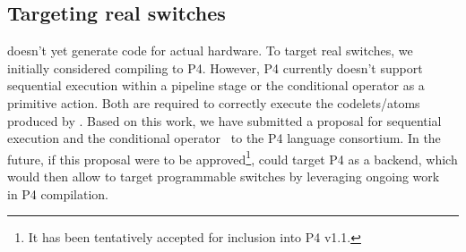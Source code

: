 \subsection{Targeting real switches}
\label{ss:real}
\pktlanguage doesn't yet generate code for actual hardware. To target real
switches, we initially considered compiling \pktlanguage to P4. However, P4
currently doesn't support sequential execution within a pipeline stage or the
conditional operator as a primitive action. Both are required to correctly
execute the codelets/atoms produced by \pktlanguage. Based on this work, we
have submitted a proposal for sequential execution and the conditional
operator~\cite{p4-semantics} to the P4 language consortium. In the future, if
this proposal were to be approved\footnote{It has been tentatively accepted for
inclusion into P4 v1.1.}, \pktlanguage could target P4 as a backend, which
would then allow \pktlanguage to target programmable switches by leveraging
ongoing work~\cite{netronome, xilinx,lavanya_compiler} in P4 compilation.
